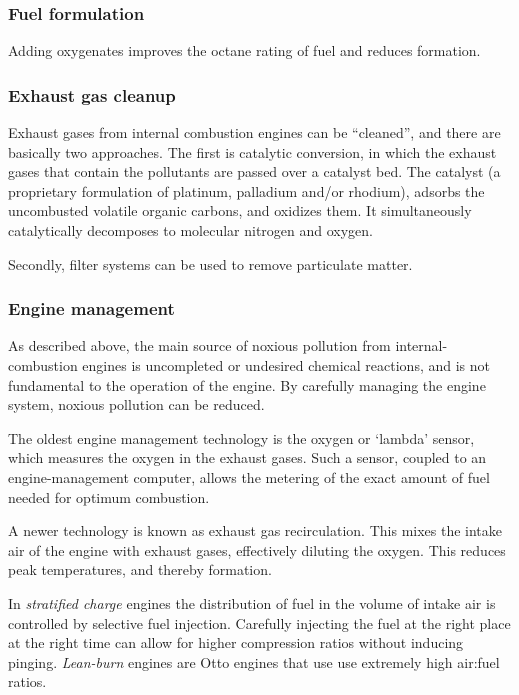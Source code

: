 \subsubsection{Fuel formulation}

Adding oxygenates improves the octane rating of fuel and reduces \nox formation. 

\subsubsection{Exhaust gas cleanup} \label{par:cleanup}

Exhaust gases from internal combustion engines can be ``cleaned'', and there are
basically two approaches. The first is catalytic conversion, in which the
exhaust gases that contain the pollutants are passed over a catalyst bed. The
catalyst (a proprietary formulation of platinum, palladium and/or rhodium),
adsorbs the uncombusted volatile organic carbons, and oxidizes them. It
simultaneously catalytically decomposes \nox to molecular nitrogen and oxygen.

Secondly, filter systems can be used to remove particulate matter. 

\subsubsection{Engine management} \label{par:engine-management}

As described above, the main source of noxious pollution from
internal\hyp{}combustion engines is uncompleted or undesired chemical reactions,
and is not fundamental to the operation of the engine. By carefully managing the
engine system, noxious pollution can be reduced. 

The oldest engine management technology is the oxygen or `lambda' sensor, which
measures the oxygen in the exhaust gases. Such a sensor, coupled to an
engine-management computer, allows the me\-ter\-ing of the exact amount of fuel
need\-ed for op\-ti\-mum combustion.

A newer technology is known as exhaust gas recirculation. This mixes the intake
air of the engine with exhaust gases, effectively diluting the oxygen. This
reduces peak temperatures, and thereby \nox formation.

In \textit{stratified charge} engines the distribution of fuel in the volume of
intake air is controlled by selective fuel injection. Carefully injecting the
fuel at the right place at the right time can allow for higher compression
ratios without inducing pinging. \textit{Lean-burn} engines are Otto engines
that use use extremely high air:fuel ratios.


